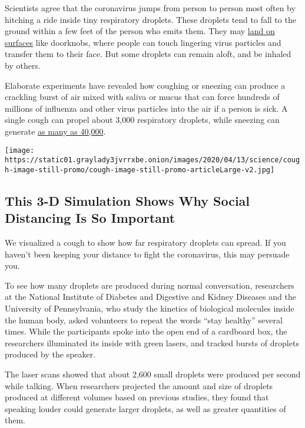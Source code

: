 Scientists agree that the coronavirus jumps from person to person most
often by hitching a ride inside tiny respiratory droplets. These
droplets tend to fall to the ground within a few feet of the person who
emits them. They may
\href{https://www.nytimes3xbfgragh.onion/2020/03/17/health/coronavirus-surfaces-aerosols.html}{land
on surfaces} like doorknobs, where people can touch lingering virus
particles and transfer them to their face. But some droplets can remain
aloft, and be inhaled by others.

Elaborate experiments have revealed how coughing or sneezing can produce
a crackling burst of air mixed with saliva or mucus that can force
hundreds of millions of influenza and other virus particles into the air
if a person is sick. A single cough can propel about 3,000 respiratory
droplets, while sneezing can generate
\href{https://www.ncbi.nlm.nih.gov/pmc/articles/PMC7132666/}{as many as
40,000}.

\href{https://www.nytimes3xbfgragh.onion/interactive/2020/04/14/science/coronavirus-transmission-cough-6-feet-ar-ul.html}{}

\texttt{[image: https://static01.graylady3jvrrxbe.onion/images/2020/04/13/science/cough-image-still-promo/cough-image-still-promo-articleLarge-v2.jpg]}

\hypertarget{this-3-d-simulation-shows-why-social-distancing-is-so-important}{%
\subsection{This 3-D Simulation Shows Why Social Distancing Is So
Important}\label{this-3-d-simulation-shows-why-social-distancing-is-so-important}}

We visualized a cough to show how far respiratory droplets can spread.
If you haven't been keeping your distance to fight the coronavirus, this
may persuade you.

To see how many droplets are produced during normal conversation,
researchers at the National Institute of Diabetes and Digestive and
Kidney Diseases and the University of Pennsylvania, who study the
kinetics of biological molecules inside the human body, asked volunteers
to repeat the words ``stay healthy'' several times. While the
participants spoke into the open end of a cardboard box, the researchers
illuminated its inside with green lasers, and tracked bursts of droplets
produced by the speaker.

The laser scans showed that about 2,600 small droplets were produced per
second while talking. When researchers projected the amount and size of
droplets produced at different volumes based on previous studies, they
found that speaking louder could generate larger droplets, as well as
greater quantities of them.

